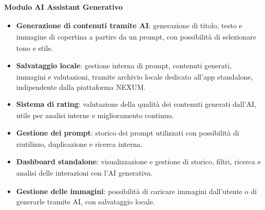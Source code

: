 ﻿\documentclass[a4paper,11pt]{article}
\begin{document}
\textbf{Modulo\textsubscript{} AI Assistant\textsubscript{} Generativo}
\begin{itemize}
    \item \textbf{Generazione di contenuti tramite AI\textsubscript{}}: 
    generazione di titolo, testo e immagine di copertina a partire da un prompt\textsubscript{}, 
    con possibilità di selezionare tono e stile.
    \item \textbf{Salvataggio locale}:
    gestione interna di prompt\textsubscript{}, contenuti generati, immagini e valutazioni, 
    tramite archivio locale dedicato all'app standalone, indipendente dalla piattaforma NEXUM.
    
    \item \textbf{Sistema di rating}: 
    valutazione della qualità\textsubscript{} dei contenuti generati dall'AI\textsubscript{}, utile per analisi interne e miglioramento continuo.

    \item \textbf{Gestione dei prompt\textsubscript{}}: 
    storico dei prompt\textsubscript{} utilizzati con possibilità di riutilizzo, duplicazione e ricerca interna.

    \item \textbf{Dashboard\textsubscript{} standalone}: 
    visualizzazione e gestione di storico, filtri, ricerca e analisi delle interazioni con l'AI\textsubscript{} generativa.

    \item \textbf{Gestione delle immagini}: 
    possibilità di caricare immagini dall'utente o di generarle tramite AI\textsubscript{}, con salvataggio locale.

\end{itemize}

\newpage
\end{document}
